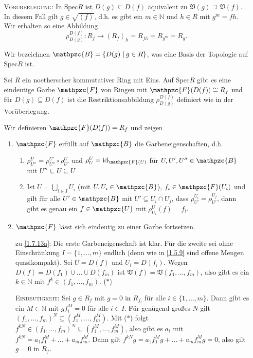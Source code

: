 \documentclass[a4paper,12pt]{scrbook}
\makeatletter
\theoremstyle{blah}
\theoremstyle{stz}
\renewcommand{\proofname}{Beweis}
\renewenvironment{proof}[1][\proofname]{\par
  \pushQED{\qed}%
  \normalfont \topsep6\p@\@plus6\p@\relax
  \trivlist
  \item[\hskip\labelsep
        \itshape
    #1\@addpunct{:}]\ignorespaces
}{%
  \popQED\endtrivlist\@endpefalse
}
\def\V{\mathfrak{V}}
\newcommand{\Spec}{\mathrm{Spec}}
\newcommand{\id}{\mathrm{id}}
\newcommand{\ra}{\longrightarrow}
\newcommand{\set}[1]{\ensuremath{\mathbb{#1}}}
\newcommand{\N}{\set{N}}
\makeatother
\begin{document}
\textsc{Vorüberlegung}: In $\Spec R$ ist $D(g)\subseteq D(f)$ äquivalent zu $\V(g)\supseteq\V(f)$. In diesem Fall gilt
$g\in\sqrt{(f)}$, d.h. es gibt ein $m\in\N$ und $h\in R$ mit $g^m=fh$. Wir erhalten so eine Abbildung
\[ \rho_{D(g)}^{D(f)}\colon R_f\ra (R_f)_h=R_{fh}=R_{g^m}=R_g. \]

Wir bezeichnen $\mathpzc{B}=\{D(g)\mid g\in R\}$, was eine Basis der Topologie auf $\Spec R$ ist.

\begin{prop}\label{1.7.13}
  Sei $R$ ein noetherscher kommutativer Ring mit Eins.
  Auf $\Spec R$ gibt es eine eindeutige Garbe $\mathpzc{F}$ von Ringen mit $\mathpzc{F}(D(f))\cong R_f$ und für $D(g)\subseteq
  D(f)$ ist die Restriktionsabbildung $\rho_{D(g)}^{D(f)}$ definiert wie in der Vorüberlegung.
\end{prop}
\begin{proof}
  Wir definieren $\mathpzc{F}(D(f))=R_f$ und zeigen
  \begin{enumerate}
  \item\label{1.7.13a} $\mathpzc{F}$ erfüllt auf $\mathpzc{B}$ die Garbeneigenschaften, d.h.
    \begin{enumerate}[label=(\textsc{g}\arabic*)]
    \item\label{G1} $\rho_{U''}^U=\rho_{U''}^{U'}\circ\rho_{U'}^U$ und $\rho_U^U=\id_{\mathpzc{F}(U)}$ für
      $U,U',U''\in\mathpzc{B}$ mit $U''\subseteq U\subseteq U$
    \item\label{G2} Ist $U=\bigcup_{i\in I}U_i$ (mit $U,U_i\in\mathpzc{B}$), $f_i\in\mathpzc{F}(U_i)$ und gilt für alle
      $U'\in\mathpzc{B}$ mit $U'\subseteq U_i\cap U_j$, dass $\rho_{U'}^{U_i}=\rho_{U'}^{U_j}$, dann gibt es genau ein
      $f\in\mathpzc{U}$ mit $\rho_{U_i}^U(f)=f_i$.
    \end{enumerate}
  \item\label{1.7.13b} $\mathpzc{F}$ lässt sich eindeutig zu einer Garbe fortsetzen.
  \end{enumerate}
  \begin{enumerate}
  \item[zu] \ref{1.7.13a}: Die erste Garbeneigenschaft ist klar. Für die zweite sei ohne Einschränkung $I=\{1,\dotsc,m\}$ endlich
    (denn wie in \autoref{1.5.9} sind offene Mengen quasikompakt). Sei $U=D(f)$ und $U_i=D(f_i)$. Wegen
    $D(f)=D(f_1)\cup\dotso\cup D(f_m)$ ist $\V(f)=\V(f_1,\dotsc,f_m)$, also gibt es ein $k\in\N$ mit
    $f^k\in(f_1,\dotsc,f_m)$. \hfill ($*$)

    \textsc{Eindeutigkeit}: Sei $g\in R_f$ mit $g=0$ in $R_{f_i}$ für alle $i\in\{1,\dotsc,m\}$. Dann gibt es ein $M\in\N$ mit
    $gf_i^M=0$ für alle $i\in I$. Für genügend großes $N$ gilt $(f_1,\dotsc,f_m)^N\subseteq(f_1^M,\dotsc,f_m^M)$. Mit ($*$)
    folgt $f^{kN}\in(f_1,\dotsc,f_m)^N\subseteq(f_1^M,\dotsc,f_m^M)$, also gibt es $a_i$ mit
    $f^{kN}=a_1f_1^M+\dotso+a_mf_m^M$. Dann gilt $f^{kN}g=a_1f_1^Mg+\dotso+a_mf_m^Mg=0$, also gilt $g=0$ in $R_f$.


\end{enumerate}
\end{proof}
\end{document}

